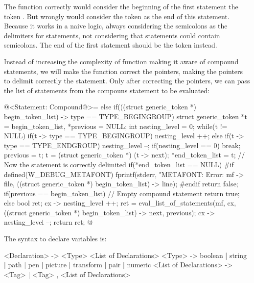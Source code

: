\alinhaverbatim
[begingroup][T1][T2][;][T3][T4][;][endgroup][;]
\alinhanormal

The function correctly would consider the beginning of the first
statement the token . But wrongly would
consider the token  as the end of this statement.
Because it works in a naive logic, always considering the semicolons
as the delimiters for statements, not considering that statements
could contain semicolons. The end of the first statement should be the
token  instead.

Instead of increasing the complexity of
function  making it aware of
compound statements, we will make the
function  correct the pointers, making
the pointers to delimit correctly the statement. Only after correcting
the pointers, we can pass the list of statements from the compouns
statement to be evaluated:

\iniciocodigo
@<Statement: Compound@>=
else if(((struct generic_token *) begin_token_list) -> type ==
        TYPE_BEGINGROUP){
  struct generic_token *t = begin_token_list, *previous = NULL;
  int nesting_level = 0;
  while(t != NULL){
    if(t -> type == TYPE_BEGINGROUP)
      nesting_level ++;
    else if(t -> type == TYPE_ENDGROUP){
      nesting_level --;
      if(nesting_level == 0)
        break;
    }
    previous = t;
    t = (struct generic_token *) (t -> next);
  }
  *end_token_list = t; // Now the statement is correctly delimited
  if(*end_token_list == NULL){
#if defined(W_DEBUG_METAFONT)
    fprintf(stderr, "METAFONT: Error: %
            mf -> file,
            ((struct generic_token *) begin_token_list) -> line);
#endif
    return false;
  }
  if(previous == begin_token_list) // Empty compound statement
    return true;
  else{
    bool ret;
    cx -> nesting_level ++;
    ret = eval_list_of_statements(mf, cx, ((struct generic_token *)
                                         begin_token_list) -> next,
                                  previous);
    cx -> nesting_level --;
    return ret;
  }
}
@
\fimcodigo



The syntax to declare variables is:

\alinhaverbatim
<Declaration> -> <Type> <List of Declarations>
<Type> -> boolean | string | path | pen | picture | transform | pair |
          numeric
<List of Declarations> -> <Tag> | <Tag> , <List of Declarations>
\alinhanormal


